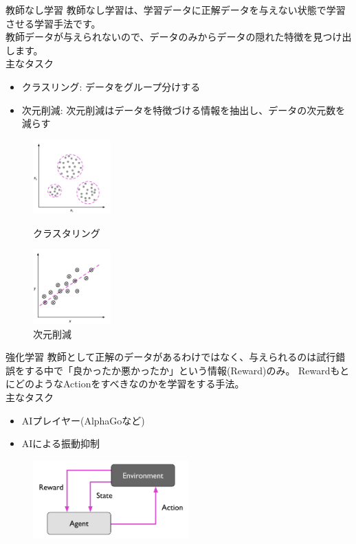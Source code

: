 \documentclass[aspectratio=169, dvipdfmx, 11pt]{beamer} %
\begin{document}
\begin{frame}{教師なし学習}
教師なし学習は、学習データに正解データを与えない状態で学習させる学習手法です。 \\
教師データが与えられないので、データのみからデータの隠れた特徴を見つけ出します。 \\
主なタスク
\begin{itemize}
    \item クラスリング: データをグループ分けする
    \item 次元削減: 次元削減はデータを特徴づける情報を抽出し、データの次元数を減らす
\end{itemize}
\begin{figure}[h]
    \begin{minipage}[b]{0.45\linewidth}
        \centering
        \includegraphics[width=30mm]{img/day01/fig02.png}
        \caption*{クラスタリング}
    \end{minipage}
    \begin{minipage}[b]{0.45\linewidth}
        \centering
        \includegraphics[width=30mm]{img/day01/fig03.png}
        \caption*{次元削減}
    \end{minipage}
\end{figure}
\end{frame}

\begin{frame}{強化学習}
    教師として正解のデータがあるわけではなく、与えられるのは試行錯誤をする中で「良かったか悪かったか」という情報(Reward)のみ。
    RewardもとにどのようなActionをすべきなのかを学習をする手法。 \\
    主なタスク
    \begin{itemize}
        \item AIプレイヤー(AlphaGoなど)
        \item AIによる振動抑制
    \end{itemize}
    \begin{figure}[b]
        \begin{center}
        \includegraphics[width=60mm]{img/day01/fig04.png}
        \end{center}
    \end{figure}  
\end{frame}
\end{document}
